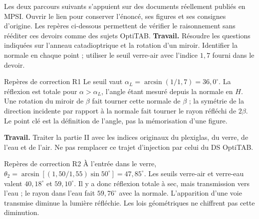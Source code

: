 Les deux parcours suivants s'appuient sur des documents réellement publiés en MPSI. Ouvrir le lien pour conserver l'énoncé, ses figures et ses consignes d'origine. Les repères ci-dessous permettent de vérifier le raisonnement sans rééditer ces devoirs comme des sujets OptiTAB.
\textbf{Travail.} Résoudre les questions indiquées sur l'anneau catadioptrique et la rotation d'un miroir. Identifier la normale en chaque point ; utiliser le seuil verre-air avec l'indice $1{,}7$ fourni dans le devoir.
\begin{docu}{Repères de correction R1}
Le seuil vaut $\alpha_L=\arcsin(1/1{,}7)=36{,}0^\circ$. La réflexion est totale pour $\alpha>\alpha_L$, l'angle étant mesuré depuis la normale en $H$. Une rotation du miroir de $\beta$ fait tourner cette normale de $\beta$ ; la symétrie de la direction incidente par rapport à la normale fait tourner le rayon réfléchi de $2\beta$. Le point clé est la définition de l'angle, pas la mémorisation d'une figure.
\end{docu}
\textbf{Travail.} Traiter la partie II avec les indices originaux du plexiglas, du verre, de l'eau et de l'air. Ne pas remplacer ce trajet d'injection par celui du DS OptiTAB.
\begin{docu}{Repères de correction R2}
À l'entrée dans le verre, $\theta_2=\arcsin[(1{,}50/1{,}55)\sin50^\circ]=47{,}85^\circ$. Les seuils verre-air et verre-eau valent $40{,}18^\circ$ et $59{,}10^\circ$. Il y a donc réflexion totale à sec, mais transmission vers l'eau ; le rayon dans l'eau fait $59{,}76^\circ$ avec la normale. L'apparition d'une voie transmise diminue la lumière réfléchie. Les lois géométriques ne chiffrent pas cette diminution.
\end{docu}

